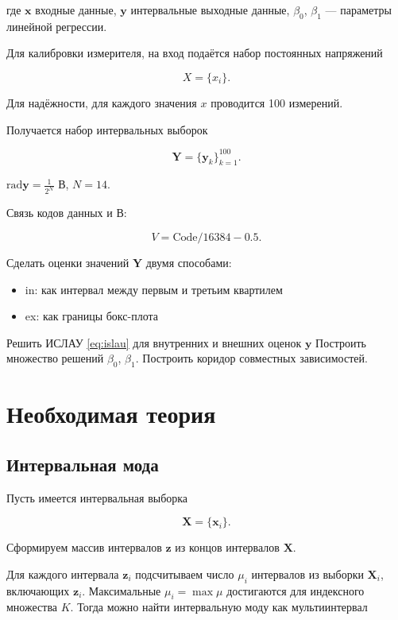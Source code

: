 \documentclass{article}
\begin{document}
  где \( \mathbf{x} \) входные данные, \( \mathbf{y} \) интервальные выходные
  данные, \( \beta_0 \), \( \beta_1 \) --- параметры линейной регрессии.

  Для калибровки измерителя, на вход подаётся набор постоянных
  напряжений

  \begin{equation}
    X = \{ x_i \}.
  \end{equation}

  Для надёжности, для каждого значения \( x \) проводится 100 измерений.

  Получается набор интервальных выборок

  \begin{equation}
    \mathbf{Y} = \{ \mathbf{y}_k \}_{k=1}^{100}.
  \end{equation}

  \( \text{rad} \mathbf{y} = \frac{1}{2^N} \) В, \( N = 14 \).

  Связь кодов данных и В:

  \[ V = \text{Code} / 16384 - 0.5. \]

  Сделать оценки значений \( \mathbf{Y} \) двумя способами:

  \begin{itemize}
    \item in: как интервал между первым и третьим квартилем
    \item ex: как границы бокс-плота
  \end{itemize}

  Решить ИСЛАУ \ref{eq:islau} для внутренних и внешних оценок
  \( \mathbf{y} \)
  Построить множество решений \( \beta_0 \), \( \beta_1 \).
  Построить коридор совместных зависимостей.

  \section{Необходимая теория}

  \subsection{Интервальная мода}

  Пусть имеется интервальная выборка

  \[
    \mathbf{X} = \{ \mathbf{x}_i \}.
  \]

  Сформируем массив интервалов \( \mathbf{z} \) из концов интервалов
  \( \mathbf{X} \).

  Для каждого интервала \( \mathbf{z}_i \) подсчитываем число \( \mu_i \)
  интервалов из выборки \( \mathbf{X}_i \), включающих \( \mathbf{z}_i \).
  Максимальные \( \mu_i = \max \mu \) достигаются для индексного множества
  \( K \). Тогда можно найти интервальную моду как мультиинтервал
\end{document}
